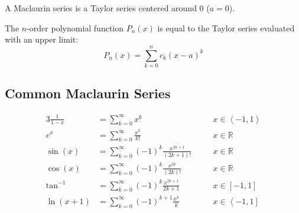 \documentclass[12pt]{article}
\newcommand*{\R}{\mathbb{R}}
\newcommand*{\rmaskip}{\setlength{\abovedisplayskip}{0pt}}
\newcommand*{\rmbskip}{\setlength{\belowdisplayskip}{0pt}}
\newcommand*{\rmskip}{\rmaskip \rmbskip}
\newcommand*{\isum}[1][k]{\sum_{#1=0}^\infty}
\begin{document}
A Maclaurin series is a Taylor series centered around 0 (\(a = 0\)).

The \(n\)-order polynomial function \(P_n(x)\) is equal to
the Taylor series evaluated with an upper limit:
\[
  P_n(x) = \sum_{k=0}^{n} c_k(x - a)^k
\]
\subsection*{Common Maclaurin Series}
{\rmskip\begin{alignat*}{3}
  \frac{1}{1-x} &= \isum x^k &&\quad x \in \left<-1,1\right>\\
  e^x &= \isum \frac{x^k}{k!} &&\quad x \in \R\\
  \sin(x) &= \isum (-1)^k \frac{x^{2k+1}}{(2k+1)!} &&\quad x \in \R\\
  \cos(x) &= \isum (-1)^k \frac{x^{2k}}{(2k)!} &&\quad x \in \R\\
  \tan^{-1} &= \isum (-1)^k \frac{x^{2k+1}}{2k+1} &&\quad x \in [-1,1]\\
  \ln(x+1) &= \isum (-1)^{k+1} \frac{x^k}{k} &&\quad x \in
    \left<-1,1\right]
\end{alignat*}}%
\end{document}
